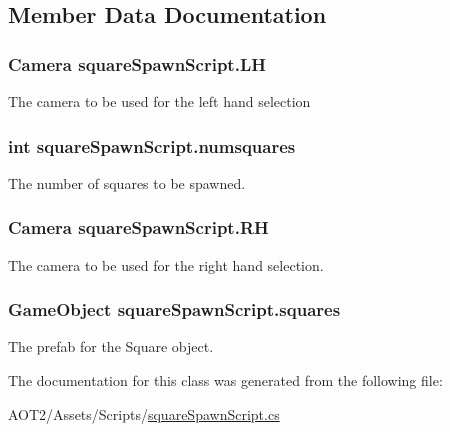 \subsection{Member Data Documentation}
\hypertarget{classsquare_spawn_script_abf8f64837c29453bfe6231d48b06b483}{
\subsubsection[{L\-H}]{\setlength{\rightskip}{0pt plus 5cm}Camera square\-Spawn\-Script.\-L\-H}}\label{classsquare_spawn_script_abf8f64837c29453bfe6231d48b06b483}
The camera to be used for the left hand selection \hypertarget{classsquare_spawn_script_aee81b01036a29f961a113a21183173e3}{
\subsubsection[{numsquares}]{\setlength{\rightskip}{0pt plus 5cm}int square\-Spawn\-Script.\-numsquares}}\label{classsquare_spawn_script_aee81b01036a29f961a113a21183173e3}
The number of squares to be spawned. \hypertarget{classsquare_spawn_script_acc39770a5d684a4b5e1057b832dc979d}{
\subsubsection[{R\-H}]{\setlength{\rightskip}{0pt plus 5cm}Camera square\-Spawn\-Script.\-R\-H}}\label{classsquare_spawn_script_acc39770a5d684a4b5e1057b832dc979d}
The camera to be used for the right hand selection. \hypertarget{classsquare_spawn_script_a353637659973cde399b46b194b30eb2e}{
\subsubsection[{squares}]{\setlength{\rightskip}{0pt plus 5cm}Game\-Object square\-Spawn\-Script.\-squares}}\label{classsquare_spawn_script_a353637659973cde399b46b194b30eb2e}
The prefab for the Square object. 

The documentation for this class was generated from the following file\-:\begin{DoxyCompactItemize}
\item 
A\-O\-T2/\-Assets/\-Scripts/\hyperlink{square_spawn_script_8cs}{square\-Spawn\-Script.\-cs}\end{DoxyCompactItemize}
